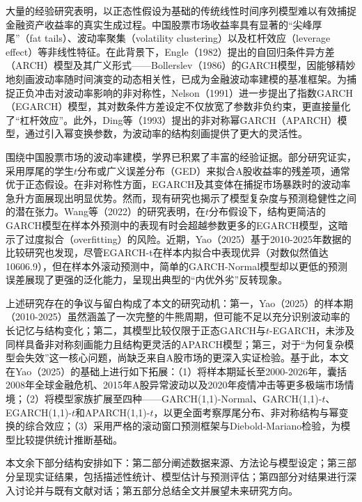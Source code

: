 \documentclass[12pt,a4paper]{ctexart}
\begin{document}
大量的经验研究表明，以正态性假设为基础的传统线性时间序列模型难以有效捕捉金融资产收益率的真实生成过程。中国股票市场收益率具有显著的“尖峰厚尾”（fat tails）、波动率聚集（volatility clustering）以及杠杆效应（leverage effect）等非线性特征\cite{wang2022, zhou2004}。在此背景下，Engle（1982）\cite{engle1982}提出的自回归条件异方差（ARCH）模型及其广义形式——Bollerslev（1986）\cite{bollerslev1986}的GARCH模型，因能够精妙地刻画波动率随时间演变的动态相关性，已成为金融波动率建模的基准框架。为捕捉正负冲击对波动率影响的非对称性，Nelson（1991）\cite{nelson1991}进一步提出了指数GARCH（EGARCH）模型，其对数条件方差设定不仅放宽了参数非负约束，更直接量化了“杠杆效应”。此外，Ding等（1993）\cite{ding1993}提出的非对称幂GARCH（APARCH）模型，通过引入幂变换参数，为波动率的结构刻画提供了更大的灵活性。

围绕中国股票市场的波动率建模，学界已积累了丰富的经验证据。部分研究证实，采用厚尾的学生$t$分布或广义误差分布（GED）来拟合A股收益率的残差项，通常优于正态假设\cite{wang2022, zhou2004}。在非对称性方面，EGARCH及其变体在捕捉市场暴跌时的波动率急升方面展现出明显优势\cite{lin2020, lama2015}。然而，现有研究也揭示了模型复杂度与预测稳健性之间的潜在张力。Wang等（2022）\cite{wang2022}的研究表明，在$t$分布假设下，结构更简洁的GARCH模型在样本外预测中的表现有时会超越参数更多的EGARCH模型，这暗示了过度拟合（overfitting）的风险。近期，Yao（2025）\cite{yao2025}基于2010-2025年数据的比较研究也发现，尽管EGARCH-t在样本内拟合中表现优异（对数似然值达10606.9），但在样本外滚动预测中，简单的GARCH-Normal模型却以更低的预测误差展现了更强的泛化能力，呈现出典型的“内优外劣”反转现象。

上述研究存在的争议与留白构成了本文的研究动机：第一，Yao（2025）的样本期（2010-2025）虽然涵盖了一次完整的牛熊周期，但可能不足以充分识别波动率的长记忆与结构变化；第二，其模型比较仅限于正态GARCH与$t$-EGARCH，未涉及同样具备非对称刻画能力且结构更灵活的APARCH模型；第三，对于“为何复杂模型会失效”这一核心问题，尚缺乏来自A股市场的更深入实证检验。基于此，本文在Yao（2025）的基础上进行如下拓展：（1）将样本期延长至2000-2026年，囊括2008年全球金融危机、2015年A股异常波动以及2020年疫情冲击等更多极端市场情境；（2）将模型家族扩展至四种——GARCH(1,1)-Normal、GARCH(1,1)-$t$、EGARCH(1,1)-$t$和APARCH(1,1)-$t$，以更全面考察厚尾分布、非对称结构与幂变换的综合效应；（3）采用严格的滚动窗口预测框架与Diebold-Mariano检验，为模型比较提供统计推断基础。

本文余下部分结构安排如下：第二部分阐述数据来源、方法论与模型设定；第三部分呈现实证结果，包括描述性统计、模型估计与预测评估；第四部分对结果进行深入讨论并与既有文献对话；第五部分总结全文并展望未来研究方向。
\end{document}

